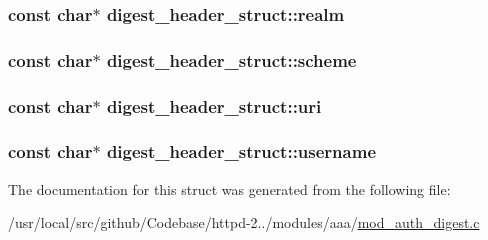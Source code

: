 \subsubsection[{\texorpdfstring{realm}{realm}}]{\setlength{\rightskip}{0pt plus 5cm}const char$\ast$ digest\+\_\+header\+\_\+struct\+::realm}\hypertarget{structdigest__header__struct_a936ac68d0274831295bf3c88a88b2b4a}{}\label{structdigest__header__struct_a936ac68d0274831295bf3c88a88b2b4a}
\subsubsection[{\texorpdfstring{scheme}{scheme}}]{\setlength{\rightskip}{0pt plus 5cm}const char$\ast$ digest\+\_\+header\+\_\+struct\+::scheme}\hypertarget{structdigest__header__struct_aa47c6deddbad4a52ea09eb7643050949}{}\label{structdigest__header__struct_aa47c6deddbad4a52ea09eb7643050949}
\subsubsection[{\texorpdfstring{uri}{uri}}]{\setlength{\rightskip}{0pt plus 5cm}const char$\ast$ digest\+\_\+header\+\_\+struct\+::uri}\hypertarget{structdigest__header__struct_a52ea9a00e5d13c55c30a8aeaac90f740}{}\label{structdigest__header__struct_a52ea9a00e5d13c55c30a8aeaac90f740}
\subsubsection[{\texorpdfstring{username}{username}}]{\setlength{\rightskip}{0pt plus 5cm}const char$\ast$ digest\+\_\+header\+\_\+struct\+::username}\hypertarget{structdigest__header__struct_a65a6fbd18676e8798b4a2d4aae2f7616}{}\label{structdigest__header__struct_a65a6fbd18676e8798b4a2d4aae2f7616}


The documentation for this struct was generated from the following file\+:\begin{DoxyCompactItemize}
\item 
/usr/local/src/github/\+Codebase/httpd-\/2../modules/aaa/\hyperlink{mod__auth__digest_8c}{mod\+\_\+auth\+\_\+digest.\+c}\end{DoxyCompactItemize}
